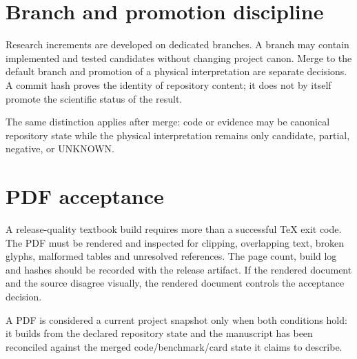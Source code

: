 \section{Branch and promotion discipline}
Research increments are developed on dedicated branches.  A branch may contain implemented and tested candidates without changing project canon.  Merge to the default branch and promotion of a physical interpretation are separate decisions.  A commit hash proves the identity of repository content; it does not by itself promote the scientific status of the result.

The same distinction applies after merge: code or evidence may be canonical repository state while the physical interpretation remains only candidate, partial, negative, or UNKNOWN.

\section{PDF acceptance}
A release-quality textbook build requires more than a successful TeX exit code.  The PDF must be rendered and inspected for clipping, overlapping text, broken glyphs, malformed tables and unresolved references.  The page count, build log and hashes should be recorded with the release artifact.  If the rendered document and the source disagree visually, the rendered document controls the acceptance decision.

A PDF is considered a current project snapshot only when both conditions hold: it builds from the declared repository state and the manuscript has been reconciled against the merged code/benchmark/card state it claims to describe.
